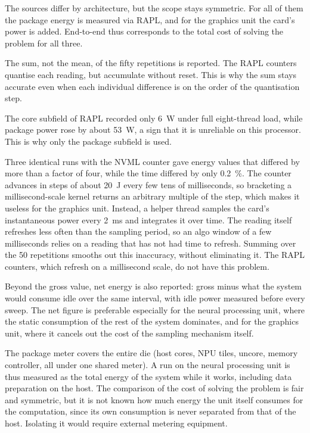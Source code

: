 The sources differ by architecture, but the scope stays symmetric. For all of
them the package energy is measured via RAPL, and for the graphics unit the
card's power is added. End-to-end thus corresponds to the total cost of solving
the problem for all three.

The sum, not the mean, of the fifty repetitions is reported. The RAPL counters
quantise each reading, but accumulate without reset. This is why the sum stays
accurate even when each individual difference is on the order of the
quantisation step.

The core subfield of RAPL recorded only \qty{6}{\watt} under full eight-thread
load, while package power rose by about \qty{53}{\watt}, a sign that it is
unreliable on this processor. This is why only the package subfield is used.

Three identical runs with the NVML counter gave energy values that differed by
more than a factor of four, while the time differed by only
\qty{0.2}{\percent}. The counter advances in steps of about \qty{20}{\joule}
every few tens of milliseconds, so bracketing a millisecond-scale kernel
returns an arbitrary multiple of the step, which makes it useless for the
graphics unit. Instead, a helper thread samples the card's instantaneous power
every \qty{2}{\milli\second} and integrates it over time. The reading itself
refreshes less often than the sampling period, so an algo window of a few
milliseconds relies on a reading that has not had time to refresh. Summing over
the 50 repetitions smooths out this inaccuracy, without eliminating it. The
RAPL counters, which refresh on a millisecond scale, do not have this problem.

Beyond the gross value, net energy is also reported: gross minus what the
system would consume idle over the same interval, with idle power measured
before every sweep. The net figure is preferable especially for the neural
processing unit, where the static consumption of the rest of the system
dominates, and for the graphics unit, where it cancels out the cost of the
sampling mechanism itself.

The package meter covers the entire die (host cores, NPU tiles, uncore, memory
controller, all under one shared meter). A run on the neural processing unit is
thus measured as the total energy of the system while it works, including data
preparation on the host. The comparison of the cost of solving the problem is
fair and symmetric, but it is not known how much energy the unit itself
consumes for the computation, since its own consumption is never separated from
that of the host. Isolating it would require external metering equipment.

